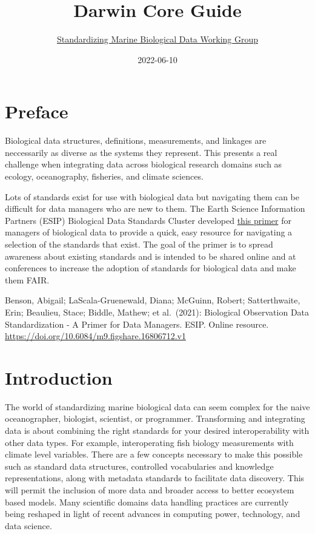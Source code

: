\documentclass[
]{book}
\title{Darwin Core Guide}
\author{\href{https://github.com/ioos/bio_data_guide/graphs/contributors}{Standardizing Marine Biological Data Working Group}}
\date{2022-06-10}
\begin{document}
\maketitle

{
\setcounter{tocdepth}{1}
\tableofcontents
}
\hypertarget{preface}{%
\chapter*{Preface}\label{preface}}

Biological data structures, definitions, measurements, and linkages are neccessarily as diverse as the systems they represent. This presents a real challenge when integrating data across biological research domains such as ecology, oceanography, fisheries, and climate sciences.

Lots of standards exist for use with biological data but navigating them can be difficult for data managers who are new to them. The Earth Science Information Partners (ESIP) Biological Data Standards Cluster developed \href{https://doi.org/10.6084/m9.figshare.16806712.v1}{this primer} for managers of biological data to provide a quick, easy resource for navigating a selection of the standards that exist. The goal of the primer is to spread awareness about existing standards and is intended to be shared online and at conferences to increase the adoption of standards for biological data and make them FAIR.

Benson, Abigail; LaScala-Gruenewald, Diana; McGuinn, Robert; Satterthwaite, Erin; Beaulieu, Stace; Biddle, Mathew; et al.~(2021): Biological Observation Data Standardization - A Primer for Data Managers. ESIP. Online resource. \url{https://doi.org/10.6084/m9.figshare.16806712.v1}

\hypertarget{intro}{%
\chapter{Introduction}\label{intro}}

The world of standardizing marine biological data can seem complex for the naive oceanographer, biologist, scientist, or programmer.
Transforming and integrating data is about combining the right standards for your desired interoperability with other data types.
For example, interoperating fish biology measurements with climate level variables.
There are a few concepts necessary to make this possible such as standard data structures, controlled vocabularies and knowledge representations, along with metadata standards to facilitate data discovery. This will permit the inclusion of more data and broader access to better ecosystem based models. Many scientific domains data handling practices are currently being reshaped in light of recent advances in computing power, technology, and data science.
\end{document}
